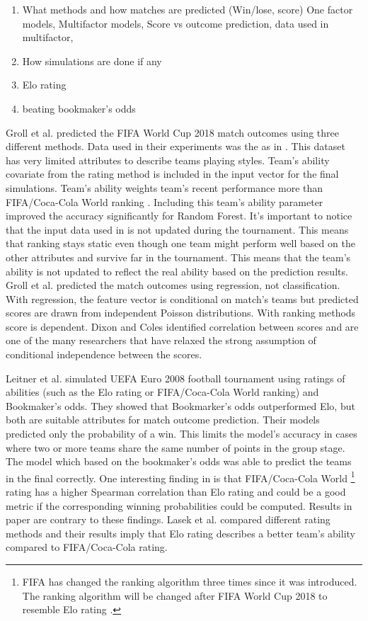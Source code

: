 \begin{enumerate}
    \item What methods and how matches are predicted (Win/lose, score)
    One factor models, Multifactor models, Score vs outcome prediction, data used in multifactor,
    \item How simulations are done if any
    \item Elo rating
    \item beating bookmaker's odds
\end{enumerate}

Groll et al. \cite{groll2018prediction} predicted the FIFA World Cup 2018 match outcomes using three different methods. Data used in their experiments was the as in \cite{groll2015prediction}. This dataset has very limited attributes to describe teams playing styles. Team's ability covariate from the rating method is included in the input vector for the final simulations. Team's ability weights team's recent performance more than FIFA/Coca-Cola World ranking . Including this team's ability parameter improved the accuracy significantly for Random Forest. It's important to notice that the input data used in \cite{groll2018prediction} is not updated during the tournament. This means that ranking stays static even though one team might perform well based on the other attributes and survive far in the tournament. This means that the team's ability is not updated to reflect the real ability based on the prediction results.
Groll et al. \cite{groll2018prediction} predicted the match outcomes using regression, not classification. With regression, the feature vector is conditional on match's teams but predicted scores are drawn from independent Poisson distributions. With ranking methods score is dependent. Dixon and Coles \cite{dixon1997} identified correlation between scores and are one of the many researchers that have relaxed the strong assumption of conditional independence between the scores.

Leitner et al. \cite{leitner2010forecasting} simulated UEFA Euro 2008 football tournament using ratings of abilities (such as the Elo rating or FIFA/Coca-Cola World ranking) and Bookmaker's odds. They showed that Bookmarker's odds outperformed Elo, but both are suitable attributes for match outcome prediction. Their models predicted only the probability of a win. This limits the model's accuracy in cases where two or more teams share the same number of points in the group stage. The model which based on the bookmaker's odds was able to predict the teams in the final correctly. One interesting finding in \cite{leitner2010forecasting} is that FIFA/Coca-Cola World \footnote{FIFA has changed the ranking algorithm three times since it was introduced. The ranking algorithm will be changed after FIFA World Cup 2018 to resemble Elo rating \cite{wiki:fifarating}.} rating has a higher Spearman correlation than Elo rating and could be a good metric if the corresponding winning probabilities could be computed. Results in paper \cite{lasek2013predictive} are contrary to these findings. Lasek et al. \cite{lasek2013predictive} compared different rating methods and their results imply that Elo rating describes a better team's ability compared to FIFA/Coca-Cola rating.

